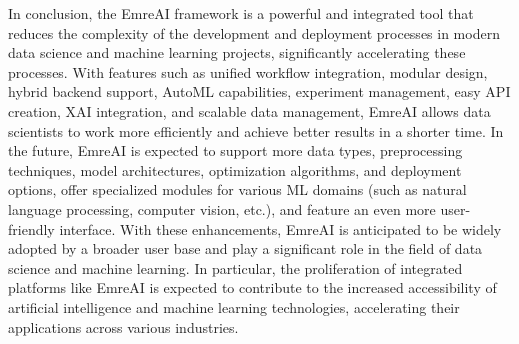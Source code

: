 \documentclass[conference]{IEEEtran}
\begin{document}
In conclusion, the EmreAI framework is a powerful and integrated tool that reduces the complexity of the development and deployment processes in modern data science and machine learning projects, significantly accelerating these processes. With features such as unified workflow integration, modular design, hybrid backend support, AutoML capabilities, experiment management, easy API creation, XAI integration, and scalable data management, EmreAI allows data scientists to work more efficiently and achieve better results in a shorter time. In the future, EmreAI is expected to support more data types, preprocessing techniques, model architectures, optimization algorithms, and deployment options, offer specialized modules for various ML domains (such as natural language processing, computer vision, etc.), and feature an even more user-friendly interface. With these enhancements, EmreAI is anticipated to be widely adopted by a broader user base and play a significant role in the field of data science and machine learning. In particular, the proliferation of integrated platforms like EmreAI is expected to contribute to the increased accessibility of artificial intelligence and machine learning technologies, accelerating their applications across various industries.


%
%

\end{document}
